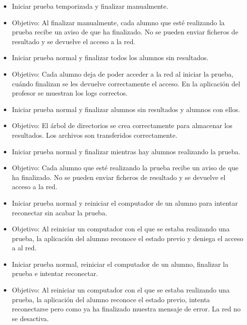\begin{itemize}
    \item Iniciar prueba temporizada y finalizar manualmente.
    \item Objetivo: Al finalizar manualmente, cada alumno que esté realizando la prueba recibe un aviso de que ha finalizado. No se pueden enviar ficheros de resultado y se devuelve el acceso a la red.
    \newline


    \item Iniciar prueba normal y finalizar todos los alumnos sin resultados.
    \item Objetivo: Cada alumno deja de poder acceder a la red al iniciar la prueba, cuándo finalizan se les devuelve correctamente el acceso. En la aplicación del profesor se muestran los logs correctos.
    \newline

    \item Iniciar prueba normal y finalizar alumnos sin resultados y alumnos con ellos.
    \item Objetivo: El árbol de directorios se crea correctamente para almacenar los resultados. Los archivos son transferidos correctamente.
    \newline

    \item Iniciar prueba normal y finalizar mientras hay alumnos realizando la prueba.
    \item Objetivo: Cada alumno que esté realizando la prueba recibe un aviso de que ha finalizado. No se pueden enviar ficheros de resultado y se devuelve el acceso a la red.
    \newline


    \item Iniciar prueba normal y reiniciar el computador de un alumno para intentar reconectar sin acabar la prueba.
    \item Objetivo: Al reiniciar un computador con el que se estaba realizando una prueba, la aplicación del alumno reconoce el estado previo y deniega el acceso a al red.
    \newline

    \item Iniciar prueba normal, reiniciar el computador de un alumno, finalizar la prueba e intentar reconectar.
    \item Objetivo: Al reiniciar un computador con el que se estaba realizando una prueba, la aplicación del alumno reconoce el estado previo, intenta reconectarse pero como ya ha finalizado muestra mensaje de error. La red no se desactiva.
    \newline



\end{itemize}
